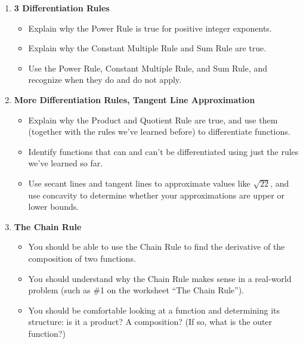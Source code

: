 \documentclass{article}
\begin{document}
\begin{enumerate}
\begin{itemize}
  \item Take discontinuities into account when constructing a sign chart for a function. 
  \end{itemize}

\item \textbf{3 Differentiation Rules} %
  \begin{itemize}
  \item Explain why the Power Rule is true for positive integer exponents.

  \item Explain why the Constant Multiple Rule and Sum Rule are true.

  \item Use the Power Rule, Constant Multiple Rule, and Sum Rule, and recognize when they do and do not apply.

  \end{itemize}

\item \textbf{More Differentiation Rules, Tangent Line Approximation} %
  \begin{itemize}
  \item Explain why the Product and Quotient Rule are true, and use them (together with the rules we've learned before) to differentiate functions.

  \item Identify functions that can and can't be differentiated using just the rules we've learned so far.

  \item Use secant lines and tangent lines to approximate values like $\sqrt{22}$, and use concavity to determine whether your approximations are upper or lower bounds. 

  \end{itemize}
  \item \textbf{The Chain Rule} %
  \begin{itemize}
  \item You should be able to use the Chain Rule to find the derivative of
  the composition of two functions.

\item You should understand why the Chain Rule makes sense in a real-world
  problem (such as {{\#1}} on {the worksheet ``The Chain Rule''}).

\item You should be comfortable looking at a function and determining its
  structure: is it a product?  A composition?  (If so, what is the outer
  function?)


\end{itemize}
\end{enumerate}
\end{document}
